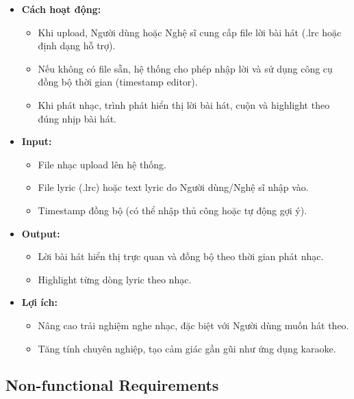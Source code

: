 \documentclass[a4paper]{article}
\begin{document}
\begin{itemize}
    \item \textbf{Cách hoạt động:}
    \begin{itemize}
        \item Khi upload, Người dùng hoặc Nghệ sĩ cung cấp file lời bài hát (.lrc hoặc định dạng hỗ trợ).
        \item Nếu không có file sẵn, hệ thống cho phép nhập lời và sử dụng công cụ đồng bộ thời gian (timestamp editor).
        \item Khi phát nhạc, trình phát hiển thị lời bài hát, cuộn và highlight theo đúng nhịp bài hát.
    \end{itemize}

    \item \textbf{Input:}
    \begin{itemize}
        \item File nhạc upload lên hệ thống.
        \item File lyric (.lrc) hoặc text lyric do Người dùng/Nghệ sĩ nhập vào.
        \item Timestamp đồng bộ (có thể nhập thủ công hoặc tự động gợi ý).
    \end{itemize}

    \item \textbf{Output:}
    \begin{itemize}
        \item Lời bài hát hiển thị trực quan và đồng bộ theo thời gian phát nhạc.
        \item Highlight từng dòng lyric theo nhạc.
    \end{itemize}

    \item \textbf{Lợi ích:}
    \begin{itemize}
        \item Nâng cao trải nghiệm nghe nhạc, đặc biệt với Người dùng muốn hát theo.
        \item Tăng tính chuyên nghiệp, tạo cảm giác gần gũi như ứng dụng karaoke.
    \end{itemize}
\end{itemize}

\subsection{Non-functional Requirements}
\end{document}
